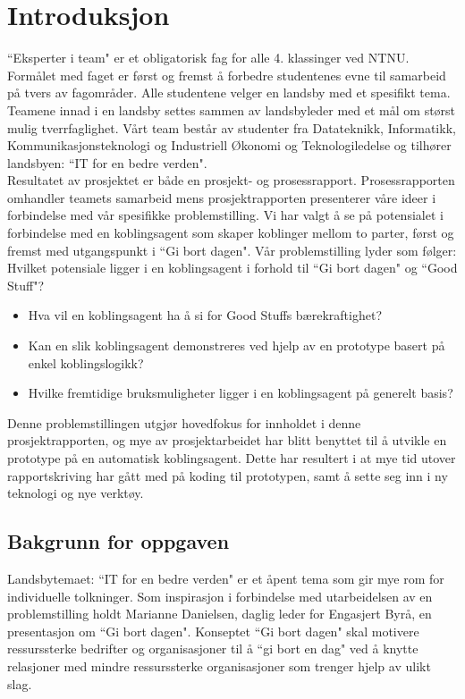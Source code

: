 \section{Introduksjon}

``Eksperter i team" er et obligatorisk fag for alle 4. klassinger ved NTNU. Formålet med faget er først og fremst å forbedre studentenes evne til samarbeid på tvers av fagområder. Alle studentene velger en landsby med et spesifikt tema. Teamene innad i en landsby settes sammen av landsbyleder med et mål om størst mulig tverrfaglighet. Vårt team består av studenter fra Datateknikk, Informatikk, Kommunikasjonsteknologi og Industriell Økonomi og Teknologiledelse og tilhører landsbyen: ``IT for en bedre verden".\\

Resultatet av prosjektet er både en prosjekt- og prosessrapport. Prosessrapporten omhandler teamets samarbeid mens prosjektrapporten presenterer våre ideer i forbindelse med vår spesifikke problemstilling. Vi har valgt å se på potensialet i forbindelse med en koblingsagent som skaper koblinger mellom to parter, først og fremst med utgangspunkt i ``Gi bort dagen". Vår problemstilling lyder som følger:
Hvilket potensiale ligger i en koblingsagent i forhold til ``Gi bort dagen" og ``Good Stuff"?

\begin{itemize}
  \item Hva vil en koblingsagent ha å si for Good Stuffs bærekraftighet?
  \item Kan en slik koblingsagent demonstreres ved hjelp av en prototype basert på enkel koblingslogikk?
  \item Hvilke fremtidige bruksmuligheter ligger i en koblingsagent på generelt basis?
\end{itemize}

Denne problemstillingen utgjør hovedfokus for innholdet i denne prosjektrapporten, og mye av prosjektarbeidet har blitt benyttet til å utvikle en prototype på en automatisk koblingsagent. Dette har resultert i at mye tid utover rapportskriving har gått med på koding til prototypen, samt å sette seg inn i ny teknologi og nye verktøy.

\subsection{Bakgrunn for oppgaven}

Landsbytemaet: ``IT for en bedre verden" er et åpent tema som gir mye rom for individuelle tolkninger. Som inspirasjon i forbindelse med utarbeidelsen av en problemstilling holdt Marianne Danielsen, daglig leder for Engasjert Byrå, en presentasjon om ``Gi bort dagen". Konseptet ``Gi bort dagen" skal motivere ressurssterke bedrifter og organisasjoner til å ``gi bort en dag" ved å knytte relasjoner med mindre ressurssterke organisasjoner som trenger hjelp av ulikt slag.

